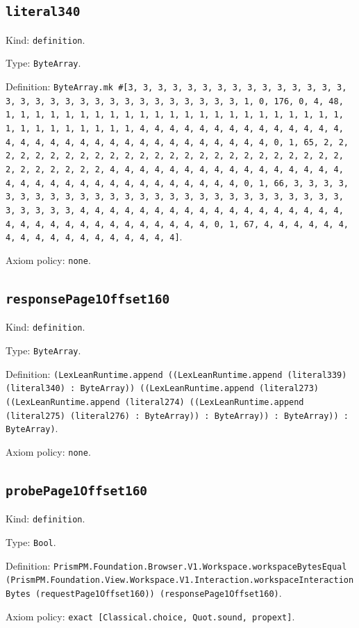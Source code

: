\documentclass[11pt]{article}
\begin{document}
\subsection*{\texttt{literal340}}
\noindent Kind: \texttt{definition}.\par
\noindent Type: \texttt{ByteArray}.\par
\noindent Definition: \texttt{ByteArray.mk \#[3, 3, 3, 3, 3, 3, 3, 3, 3, 3, 3, 3, 3, 3, 3, 3, 3, 3, 3, 3, 3, 3, 3, 3, 3, 3, 3, 3, 3, 3, 3, 1, 0, 176, 0, 4, 48, 1, 1, 1, 1, 1, 1, 1, 1, 1, 1, 1, 1, 1, 1, 1, 1, 1, 1, 1, 1, 1, 1, 1, 1, 1, 1, 1, 1, 1, 1, 1, 1, 4, 4, 4, 4, 4, 4, 4, 4, 4, 4, 4, 4, 4, 4, 4, 4, 4, 4, 4, 4, 4, 4, 4, 4, 4, 4, 4, 4, 4, 4, 4, 4, 0, 1, 65, 2, 2, 2, 2, 2, 2, 2, 2, 2, 2, 2, 2, 2, 2, 2, 2, 2, 2, 2, 2, 2, 2, 2, 2, 2, 2, 2, 2, 2, 2, 2, 2, 4, 4, 4, 4, 4, 4, 4, 4, 4, 4, 4, 4, 4, 4, 4, 4, 4, 4, 4, 4, 4, 4, 4, 4, 4, 4, 4, 4, 4, 4, 4, 4, 0, 1, 66, 3, 3, 3, 3, 3, 3, 3, 3, 3, 3, 3, 3, 3, 3, 3, 3, 3, 3, 3, 3, 3, 3, 3, 3, 3, 3, 3, 3, 3, 3, 3, 3, 4, 4, 4, 4, 4, 4, 4, 4, 4, 4, 4, 4, 4, 4, 4, 4, 4, 4, 4, 4, 4, 4, 4, 4, 4, 4, 4, 4, 4, 4, 4, 4, 0, 1, 67, 4, 4, 4, 4, 4, 4, 4, 4, 4, 4, 4, 4, 4, 4, 4, 4, 4, 4]}.\par
\noindent Axiom policy: \texttt{none}.\par
\subsection*{\texttt{responsePage1Offset160}}
\noindent Kind: \texttt{definition}.\par
\noindent Type: \texttt{ByteArray}.\par
\noindent Definition: \texttt{(LexLeanRuntime.append ((LexLeanRuntime.append (literal339) (literal340) : ByteArray)) ((LexLeanRuntime.append (literal273) ((LexLeanRuntime.append (literal274) ((LexLeanRuntime.append (literal275) (literal276) : ByteArray)) : ByteArray)) : ByteArray)) : ByteArray)}.\par
\noindent Axiom policy: \texttt{none}.\par
\subsection*{\texttt{probePage1Offset160}}
\noindent Kind: \texttt{definition}.\par
\noindent Type: \texttt{Bool}.\par
\noindent Definition: \texttt{PrismPM.Foundation.Browser.V1.Workspace.workspaceBytesEqual (PrismPM.Foundation.View.Workspace.V1.Interaction.workspaceInteractionBytes (requestPage1Offset160)) (responsePage1Offset160)}.\par
\noindent Axiom policy: \texttt{exact [Classical.choice, Quot.sound, propext]}.\par
\end{document}
